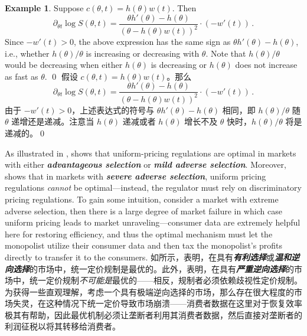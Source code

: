 \documentclass[12pt,letterpaper]{article}
\newenvironment{original}{\color{black}\noindent}{}
\newenvironment{translation}{\color{blue}\noindent}{}
\theoremstyle{plain}
\theoremstyle{definition}
\newtheorem{ex}{Example}
\theoremstyle{remark}
\renewcommand{\1}{\mathds{1}}
\theoremstyle{definition}
\begin{document}
\begin{ex}\label{ex:regulation}
\begin{original}
Suppose $c(\theta, t) = h(\theta)w(t)$. Then
\[\partial_{\theta t} \log S(\theta, t) =\frac{\theta h'(\theta) - h(\theta)}{(\theta - h(\theta) w(t))^2} \cdot (-w'(t))\,.\]
Since $-w'(t) > 0$, the above expression has the same sign as $\theta h'(\theta) - h(\theta)$, i.e., whether $h(\theta)/\theta$ is increasing or decreasing with $\theta$. Note that $h(\theta)/\theta$ would be decreasing when either $h(\theta)$ is decreasing or $h(\theta)$ does not increase as fast as $\theta$.    \qed
\end{original}
\begin{translation}
假设 $c(\theta, t) = h(\theta)w(t)$。那么
\[\partial_{\theta t} \log S(\theta, t) =\frac{\theta h'(\theta) - h(\theta)}{(\theta - h(\theta) w(t))^2} \cdot (-w'(t))\,.\]
由于 $-w'(t) > 0$，上述表达式的符号与 $\theta h'(\theta) - h(\theta)$ 相同，即 $h(\theta)/\theta$ 随 $\theta$ 递增还是递减。注意当 $h(\theta)$ 递减或者 $h(\theta)$ 增长不及 $\theta$ 快时，$h(\theta)/\theta$ 将是递减的。\qed
\end{translation}
\end{ex}

\begin{original}
As illustrated in ,  shows that uniform-pricing regulations are optimal in markets with either \textit{\textbf{advantageous selection}} or \textit{\textbf{mild adverse selection}}. Moreover,  shows that in markets with \textit{\textbf{severe adverse selection}}, uniform pricing regulations \textit{cannot} be optimal---instead, the regulator must rely on discriminatory pricing regulations.
To gain some intuition, consider a market with extreme adverse selection, then there is a large degree of market failure in which case uniform pricing leads to market unraveling---consumer data are extremely helpful here for restoring efficiency, and thus the optimal mechanism must let the monopolist utilize their consumer data and then tax the monopolist's profits directly to transfer it to the consumers.
\end{original}
\begin{translation}
如所示，表明，在具有\textit{\textbf{有利选择}}或\textit{\textbf{温和逆向选择}}的市场中，统一定价规制是最优的。此外，表明，在具有\textit{\textbf{严重逆向选择}}的市场中，统一定价规制\textit{不可能是}最优的——相反，规制者必须依赖歧视性定价规制。
为获得一些直观理解，考虑一个具有极端逆向选择的市场，那么存在很大程度的市场失灵，在这种情况下统一定价导致市场崩溃——消费者数据在这里对于恢复效率极其有帮助，因此最优机制必须让垄断者利用其消费者数据，然后直接对垄断者的利润征税以将其转移给消费者。
\end{translation}
\end{document}
